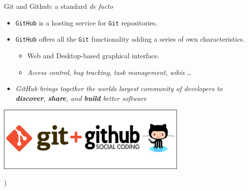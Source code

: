 \documentclass[ignorenonframetext,]{beamer}
\providecommand{\tightlist}{%
  \setlength{\itemsep}{0pt}\setlength{\parskip}{0pt}}
\begin{document}
\begin{frame}[fragile]{%
\protect\hypertarget{git-and-github-a-standard-de-facto}{%
Git and Github: a standard \emph{de facto}}}

\begin{itemize}
\tightlist
\item
  \texttt{GitHub} is a hosting service for \texttt{Git} repositories.
\item
  \texttt{GitHub} offers all the \texttt{Git} functionality adding a
  series of own characteristics.

  \begin{itemize}
  \tightlist
  \item
    Web and Desktop-based graphical interface.
  \item
    \emph{Access control}, \emph{bug tracking}, \emph{task management},
    \emph{wikis} \ldots{}
  \end{itemize}
\item
  \emph{GitHub brings together the worlds largest community of
  developers to \textbf{discover}, \textbf{share}, and \textbf{build}
  better software}
\end{itemize}

\begin{center}
\includegraphics[width=0.7\textwidth]{"images/gitAndGithub"}
\end{center}

)

\end{frame}
\end{document}
